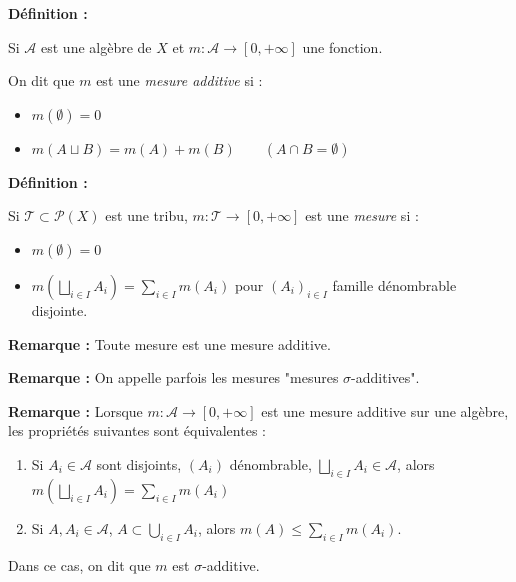 \documentclass[10pt,a4paper,notitlepage ]{report}
\newcommand{\1}{\mathds 1}
\newenvironment{definition}[1][]{
	
	\textbf{Définition #1 : }
}
{}
\newcounter{th}
\newenvironment{rem}{
	
		\textbf{Remarque :}}{}
\begin{document}
\begin{definition}
	Si $\mathcal A$ est une algèbre de $X$ et $m:\mathcal A \rightarrow [0,+\infty]$ une fonction.
	
	On dit que $m$ est une \emph{mesure additive} si :
	\begin{itemize}
		\item $m(\emptyset) = 0$
		\item $m(A\sqcup B) = m(A) + m(B) \qquad (A\cap B = \emptyset)$
	\end{itemize}
\end{definition}

\begin{definition}
	Si $\mathcal T \subset \mathcal P(X)$ est une tribu, $m:\mathcal T \rightarrow [0,+\infty]$ est une \emph{mesure} si :
	\begin{itemize}
		\item $m(\emptyset) = 0$
		\item $m(\underset{i\in I}{\bigsqcup}A_i) = \sum_{i\in I}m(A_i)$ pour $(A_i)_{i\in I}$ famille dénombrable disjointe.
	\end{itemize}
\end{definition}
\begin{rem}
	Toute mesure est une mesure additive.
\end{rem}

\begin{rem}
On appelle parfois les mesures "mesures $\sigma$-additives".
\end{rem}

\begin{rem}
	Lorsque $m:\mathcal A \rightarrow [0,+\infty]$ est une mesure additive sur une algèbre, les propriétés suivantes sont équivalentes :
	\begin{enumerate}
		\item Si $A_i\in\mathcal A$ sont disjoints, $(A_i)$ dénombrable, $\underset{i\in I}{\bigsqcup}A_i \in \mathcal A$, alors $m(\underset{i\in I}{\bigsqcup}A_i) = \sum_{i\in I}m(A_i)$
		\item Si $A,A_i\in\mathcal A$, $A\subset \underset{i\in I}{\bigcup}A_i$, alors $m(A) \le \sum_{i\in I}m(A_i)$.
	\end{enumerate}
Dans ce cas, on dit que $m$ est $\sigma$-additive.
\end{rem}
\end{document}
